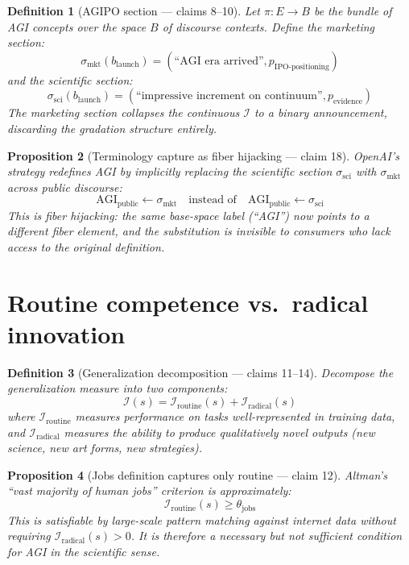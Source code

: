 \documentclass[11pt,a4paper]{article}
\newtheorem{definition}{Definition}[section]
\newtheorem{proposition}[definition]{Proposition}
\begin{document}
\begin{definition}[AGIPO section --- claims 8--10]
\label{def:agipo}
Let $\pi : E \to B$ be the bundle of AGI concepts over the space
$B$ of discourse contexts. Define the marketing section:
\[
  \sigma_{\text{mkt}}(b_{\text{launch}}) =
    (\text{``AGI era arrived''}, p_{\text{IPO-positioning}})
\]
and the scientific section:
\[
  \sigma_{\text{sci}}(b_{\text{launch}}) =
    (\text{``impressive increment on continuum''}, p_{\text{evidence}})
\]
The marketing section collapses the continuous $\mathcal{I}$ to a binary
announcement, discarding the gradation structure entirely.
\end{definition}

\begin{proposition}[Terminology capture as fiber hijacking --- claim 18]
\label{prop:capture}
OpenAI's strategy redefines AGI by implicitly replacing the scientific
section $\sigma_{\text{sci}}$ with $\sigma_{\text{mkt}}$ across public
discourse:
\[
  \text{AGI}_{\text{public}} \leftarrow \sigma_{\text{mkt}}
  \quad \text{instead of} \quad
  \text{AGI}_{\text{public}} \leftarrow \sigma_{\text{sci}}
\]
This is fiber hijacking: the same base-space label (``AGI'') now points to
a different fiber element, and the substitution is invisible to consumers
who lack access to the original definition.
\end{proposition}

\section{Routine competence vs.\ radical innovation}
\label{sec:routine-radical}

\begin{definition}[Generalization decomposition --- claims 11--14]
\label{def:decomp}
Decompose the generalization measure into two components:
\[
  \mathcal{I}(s) = \mathcal{I}_{\text{routine}}(s) + \mathcal{I}_{\text{radical}}(s)
\]
where $\mathcal{I}_{\text{routine}}$ measures performance on tasks well-represented
in training data, and $\mathcal{I}_{\text{radical}}$ measures the ability to
produce qualitatively novel outputs (new science, new art forms, new strategies).
\end{definition}

\begin{proposition}[Jobs definition captures only routine --- claim 12]
\label{prop:jobs}
Altman's ``vast majority of human jobs'' criterion is approximately:
\[
  \mathcal{I}_{\text{routine}}(s) \geq \theta_{\text{jobs}}
\]
This is satisfiable by large-scale pattern matching against internet data
without requiring $\mathcal{I}_{\text{radical}}(s) > 0$. It is therefore
a necessary but not sufficient condition for AGI in the scientific sense.
\end{proposition}
\end{document}

